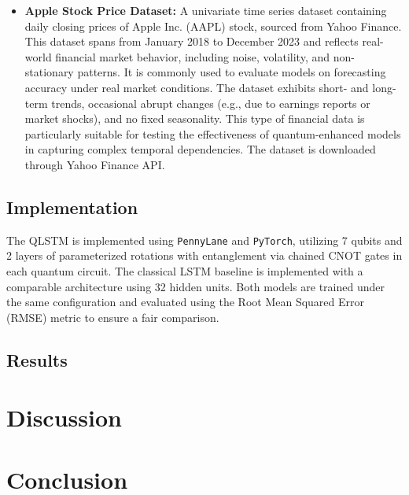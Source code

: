 \documentclass[conference]{IEEEtran}
\begin{document}
\begin{itemize}
    \item \textbf{Apple Stock Price Dataset:} A univariate time series dataset containing daily closing prices of Apple Inc. (AAPL) stock, sourced from Yahoo Finance. This dataset spans from January 2018 to December 2023 and reflects real-world financial market behavior, including noise, volatility, and non-stationary patterns. It is commonly used to evaluate models on forecasting accuracy under real market conditions. The dataset exhibits short- and long-term trends, occasional abrupt changes (e.g., due to earnings reports or market shocks), and no fixed seasonality. This type of financial data is particularly suitable for testing the effectiveness of quantum-enhanced models in capturing complex temporal dependencies. The dataset is downloaded through Yahoo Finance API.
\end{itemize}


\subsection{Implementation}
The QLSTM is implemented using \texttt{PennyLane} and \texttt{PyTorch}, utilizing 7 qubits and 2 layers of parameterized rotations with entanglement via chained CNOT gates in each quantum circuit. The classical LSTM baseline is implemented with a comparable architecture using 32 hidden units. Both models are trained under the same configuration and evaluated using the Root Mean Squared Error (RMSE) metric to ensure a fair comparison.

\subsection{Results}


\section{Discussion}
\label{sec:discussion}



\section{Conclusion}
\label{sec:conclusion}






\end{document}
